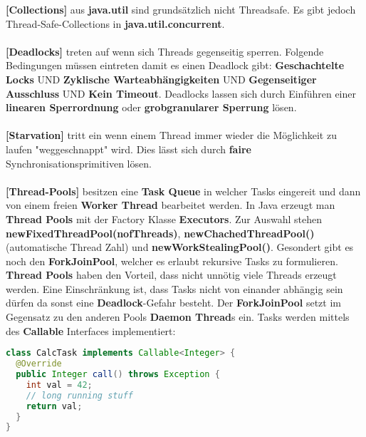 \documentclass[8pt]{extarticle}
\let\oldtextbf\textbf
\renewcommand{\textbf}{\tiny\oldtextbf}
\begin{document}
\begin{multicols*}{5}
\textbf{[Collections]} aus \textbf{java.util} sind grundsätzlich nicht Threadsafe. Es gibt jedoch Thread-Safe-Collections in \textbf{java.util.concurrent}.\\\\
\textbf{[Deadlocks]} treten auf wenn sich Threads gegenseitig sperren. Folgende Bedingungen müssen eintreten damit es einen Deadlock gibt: \textbf{Geschachtelte Locks} UND \textbf{Zyklische Warteabhängigkeiten} UND \textbf{Gegenseitiger Ausschluss} UND \textbf{Kein Timeout}. Deadlocks lassen sich durch Einführen einer \textbf{linearen Sperrordnung} oder \textbf{grobgranularer Sperrung} lösen.\\\\
\textbf{[Starvation]} tritt ein wenn einem Thread immer wieder die Möglichkeit zu laufen "weggeschnappt" wird. Dies lässt sich durch \textbf{faire} Synchronisationsprimitiven lösen.\\\\
\textbf{[Thread-Pools]} besitzen eine \textbf{Task Queue} in welcher Tasks eingereit und dann von einem freien \textbf{Worker Thread} bearbeitet werden. In Java erzeugt man \textbf{Thread Pools} mit der Factory Klasse \textbf{Executors}. Zur Auswahl stehen \textbf{newFixedThreadPool(nofThreads)}, \textbf{newChachedThreadPool()} (automatische Thread Zahl) und \textbf{newWorkStealingPool()}. Gesondert gibt es noch den \textbf{ForkJoinPool}, welcher es erlaubt rekursive Tasks zu formulieren. \textbf{Thread Pools} haben den Vorteil, dass nicht unnötig viele Threads erzeugt werden. Eine Einschränkung ist, dass Tasks nicht von einander abhängig sein dürfen da sonst eine \textbf{Deadlock}-Gefahr besteht. Der \textbf{ForkJoinPool} setzt im Gegensatz zu den anderen Pools \textbf{Daemon Thread}s ein. Tasks werden mittels des \textbf{Callable} Interfaces implementiert:
\begin{lstlisting}[language=java]
class CalcTask implements Callable<Integer> {
  @Override
  public Integer call() throws Exception {
    int val = 42;
    // long running stuff
    return val;
  }
}


\end{lstlisting}
\end{multicols*}
\end{document}

